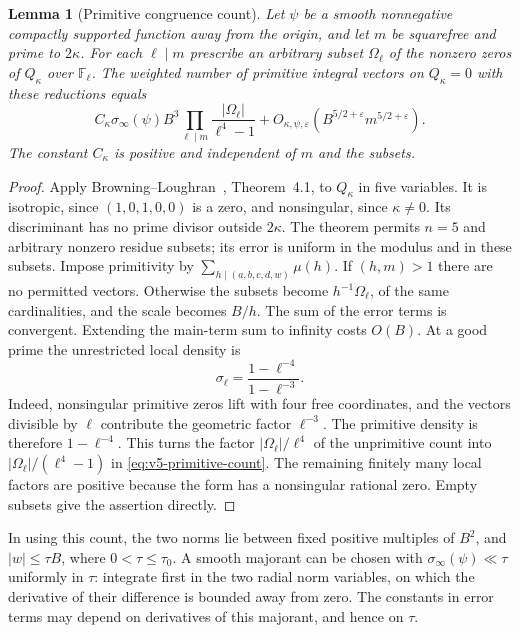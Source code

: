 \documentclass[11pt]{article}
\newtheorem{lemma}[theorem]{Lemma}
\theoremstyle{definition}
\theoremstyle{remark}
\begin{document}
\begin{lemma}[Primitive congruence count]\label{lem:v5-primitive-count}
Let $\psi$ be a smooth nonnegative compactly supported function away from
the origin, and let $m$ be squarefree and prime to $2\kappa$.
For each $\ell\mid m$ prescribe an arbitrary subset $\Omega_\ell$ of the
nonzero zeros of $Q_\kappa$ over $\mathbb F_\ell$. The weighted number of
primitive integral vectors on $Q_\kappa=0$ with these reductions equals
\begin{equation}\label{eq:v5-primitive-count}
 C_\kappa\sigma_\infty(\psi)B^3
 \prod_{\ell\mid m}\frac{|\Omega_\ell|}{\ell^4-1}
 +O_{\kappa,\psi,\varepsilon}
       (B^{5/2+\varepsilon}m^{5/2+\varepsilon}).
\end{equation}
The constant $C_\kappa$ is positive and independent of $m$ and the subsets.
\end{lemma}
\begin{proof}
Apply Browning--Loughran~\cite{v5bl}, Theorem~4.1, to $Q_\kappa$ in five
variables. It is isotropic, since $(1,0,1,0,0)$ is a zero, and nonsingular,
since $\kappa\ne0$. Its discriminant has no prime divisor outside
$2\kappa$. The theorem permits $n=5$ and arbitrary nonzero residue subsets;
its error is uniform in the modulus and in these subsets.
Impose primitivity by $\sum_{h\mid(a,b,c,d,w)}\mu(h)$.
If $(h,m)>1$ there are no permitted vectors. Otherwise the subsets become
$h^{-1}\Omega_\ell$, of the same cardinalities, and the scale becomes $B/h$.
The sum of the error terms is convergent. Extending the main-term sum to
infinity costs $O(B)$.
At a good prime the unrestricted local density is
\[
 \sigma_\ell=\frac{1-\ell^{-4}}{1-\ell^{-3}}.
\]
Indeed, nonsingular primitive zeros lift with four free coordinates, and
the vectors divisible by $\ell$ contribute the geometric factor
$\ell^{-3}$. The primitive density is therefore $1-\ell^{-4}$.
This turns the factor $|\Omega_\ell|/\ell^4$ of the unprimitive count into
$|\Omega_\ell|/(\ell^4-1)$ in \eqref{eq:v5-primitive-count}.
The remaining finitely many local factors are positive because the form
has a nonsingular rational zero. Empty subsets give the assertion directly.
\end{proof}

In using this count, the two norms lie between fixed positive multiples of
$B^2$, and $|w|\leq\tau B$, where $0<\tau\leq\tau_0$.
A smooth majorant can be chosen with
$\sigma_\infty(\psi)\ll\tau$ uniformly in $\tau$: integrate first in the
two radial norm variables, on which the derivative of their difference is
bounded away from zero. The constants in error terms may depend on
derivatives of this majorant, and hence on $\tau$.
\end{document}
